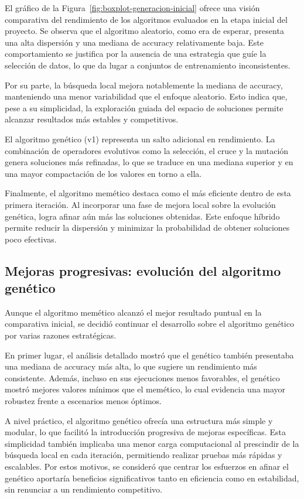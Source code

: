 El gráfico de la Figura~\ref{fig:boxplot-generacion-inicial} ofrece una visión comparativa del rendimiento de los algoritmos evaluados en la etapa inicial del proyecto.
Se observa que el algoritmo aleatorio, como era de esperar, presenta una alta dispersión y una mediana de accuracy relativamente baja.
Este comportamiento se justifica por la ausencia de una estrategia que guíe la selección de datos, lo que da lugar a conjuntos de entrenamiento inconsistentes.


Por su parte, la búsqueda local mejora notablemente la mediana de accuracy, manteniendo una menor variabilidad que el enfoque aleatorio.
Esto indica que, pese a su simplicidad, la exploración guiada del espacio de soluciones permite alcanzar resultados más estables y competitivos.


El algoritmo genético (v1) representa un salto adicional en rendimiento.
La combinación de operadores evolutivos como la selección, el cruce y la mutación genera soluciones más refinadas,
lo que se traduce en una mediana superior y en una mayor compactación de los valores en torno a ella.


Finalmente, el algoritmo memético destaca como el más eficiente dentro de esta primera iteración.
Al incorporar una fase de mejora local sobre la evolución genética, logra afinar aún más las soluciones obtenidas.
Este enfoque híbrido permite reducir la dispersión y minimizar la probabilidad de obtener soluciones poco efectivas.


\subsection{Mejoras progresivas: evolución del algoritmo genético}\label{sec:mejoras-progresivas-evolucion-algoritmo-genetico}
Aunque el algoritmo memético alcanzó el mejor resultado puntual en la comparativa inicial, se decidió continuar el desarrollo
sobre el algoritmo genético por varias razones estratégicas.


En primer lugar, el análisis detallado mostró que el genético también presentaba una mediana de accuracy más alta,
lo que sugiere un rendimiento más consistente.
Además, incluso en sus ejecuciones menos favorables, el genético mostró mejores valores mínimos que el memético,
lo cual evidencia una mayor robustez frente a escenarios menos óptimos.


A nivel práctico, el algoritmo genético ofrecía una estructura más simple y modular, lo que facilitó la introducción progresiva de mejoras específicas.
Esta simplicidad también implicaba una menor carga computacional al prescindir de la búsqueda local en cada iteración,
permitiendo realizar pruebas más rápidas y escalables.
Por estos motivos, se consideró que centrar los esfuerzos en afinar el genético aportaría beneficios significativos
tanto en eficiencia como en estabilidad, sin renunciar a un rendimiento competitivo.



